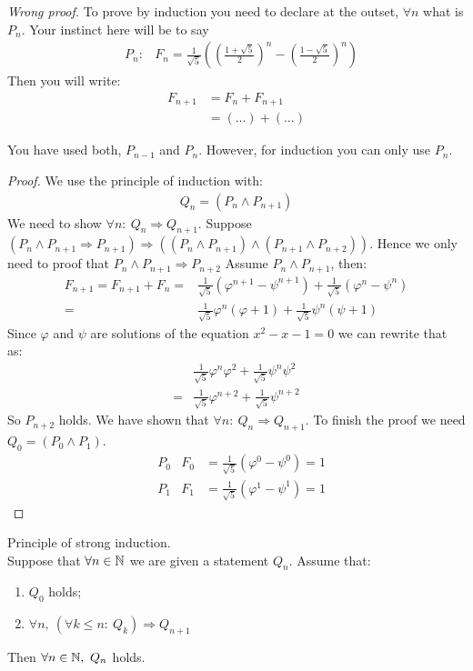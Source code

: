 \emph{Wrong proof.} To prove by induction you need to declare at the outset, $\forall n$ what is $P_n$. Your instinct here will be to say 
\begin{align*}
& P_n: & F_n = \frac {1}{\sqrt 5} \left( \left( \frac{1+\sqrt 5} 2 \right)^n - \left( \frac{1-\sqrt 5}{2} \right)^n \right) 
\end{align*}
Then you will write:
\begin{align*}
F_{n+1} & = F_n + F_{n+1} \\
 & = ( \dots ) + ( \dots)
\end{align*}
\begin{rk}
You have used both, $P_{n-1}$ and $P_n$. However, for induction you can only use $P_n$. 
\end{rk}
\begin{proof}
We use the principle of induction with:
\begin{align*}
Q_n = (P_n \wedge P_{n+1} )
\end{align*}
We need to show $\forall n: ~Q_n \Rightarrow Q_{n+1}$. Suppose $(P_n \wedge P_{n+1} \Rightarrow P_{n+1}) \Rightarrow ((P_n \wedge P_{n+1}) \wedge (P_{n+1} \wedge P_{n+2}))$.
Hence we only need to proof that $P_n \wedge P_{n+1} \Rightarrow P_{n+2}$
Assume $P_n \wedge P_{n+1}$, then:
\begin{align*}
F_{n+1} = F_{n+1} +F_n = & \frac 1 {\sqrt 5} \left( \varphi^{n+1} - \psi^{n+1} \right) + \frac 1 {\sqrt 5} \left( \varphi^n -\psi^n \right)  \\
= & \frac 1 {\sqrt 5} \varphi^n (\varphi+1) + \frac 1 {\sqrt 5} \psi^n(\psi+1) 
\end{align*}
Since $\varphi$ and $\psi$ are solutions of the equation $x^2-x-1=0$ we can rewrite that as:
\begin{align*}
 & \frac 1 {\sqrt 5} \varphi^n \varphi^2 + \frac 1 {\sqrt 5} \psi^n \psi^2 \\
= & \frac {1}{\sqrt 5} \varphi^{n+2} + \frac 1 {\sqrt 5} \psi^{n+2}
\end{align*}
So $P_{n+2}$ holds. We have shown that $\forall n: ~ Q_n \Rightarrow Q_{n+1}$. To finish the proof we need $Q_0 = (P_0 \wedge P_1)$.
\begin{align*}
& P_0 & F_0 &= \frac 1 {\sqrt 5} \left( \varphi^0 - \psi^0 \right) = 1 \\
& P_1 & F_1 & = \frac 1 {\sqrt 5} \left( \varphi^1 - \psi^1 \right) =1
\end{align*}
\end{proof}
\begin{tm}
Principle of strong induction. \\
Suppose that $\forall n \in \mathbb N$ we are given a statement $Q_n$.
Assume that:
\begin{enumerate}
\item
$Q_0$ holds;
\item
$\forall n, ~ (\forall k \leq n: ~ Q_k) \Rightarrow Q_{n+1}$
\end{enumerate}
Then $\forall n \in \mathbb N, ~Q_n$ holds.
\end{tm}


